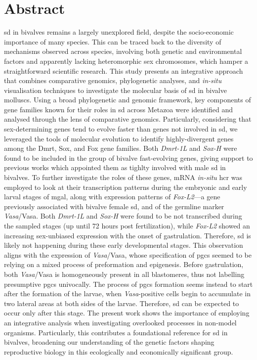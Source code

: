 {
\chapter*{Abstract}
\label{abstract}
}

\Gls{sd} in bivalves remains a largely unexplored field, despite the socio-economic importance of many species. This can be traced back to the diversity of mechanisms observed across species, involving both genetic and environmental factors and apparently lacking heteromorphic sex chromosomes, which hamper a straightforward scientific research. This study presents an integrative approach that combines comparative genomics, phylogenetic analyses, and \textit{in-situ} visualisation techniques to investigate the molecular basis of \gls{sd} in bivalve molluscs. Using a broad phylogenetic and genomic framework, key components of gene families known for their roles in \gls{sd} across Metazoa were identified and analysed through the lens of comparative genomics. Particularly, considering that sex-determining genes tend to evolve faster than genes not involved in \gls{sd}, we leveraged the tools of molecular evolution to identify highly-divergent genes among the Dmrt, Sox, and Fox gene families. Both \textit{Dmrt-1L} and \textit{Sox-H} were found to be included in the group of bivalve fast-evolving genes, giving support to previous works which appointed them as tighlty involved with male \gls{sd} in bivalves. To further investigate the roles of these genes, mRNA \textit{in-situ} \gls{hcr} was employed to look at their transcription patterns during the embryonic and early larval stages of \gls{mgal}, along with expression patterns of \textit{Fox-L2}---a gene previously associated with bivalve female \gls{sd}, and of the germline marker \textit{Vasa}/Vasa. Both \textit{Dmrt-1L} and \textit{Sox-H} were found to be not transcribed during the sampled stages (up until 72 hours post fertilization), while \textit{Fox-L2} showed an increasing sex-unbiased expression with the onset of gastrulation. Therefore, \gls{sd} is likely not happening during these early developmental stages. This observation aligns with the expression of \textit{Vasa}/Vasa, whose specification of \glspl{pgc} seemed to be relying on a mixed process of preformation and epigenesis. Before gastrulation, both \textit{Vasa}/Vasa is homogeneously present in all blastomeres, thus not labelling presumptive \glspl{pgc} univocally. The process of \glspl{pgc} formation seems instead to start after the formation of the larvae, when \textit{Vasa}-positive cells begin to accumulate in two lateral areas at both sides of the larvae. Therefore, \gls{sd} can be expected to occur only after this stage. The present work shows the importance of employing an integrative analysis when investigating overlooked processes in non-model organisms. Particularly, this contributes a foundational reference for \gls{sd} in bivalves, broadening our understanding of the genetic factors shaping reproductive biology in this ecologically and economically significant group.